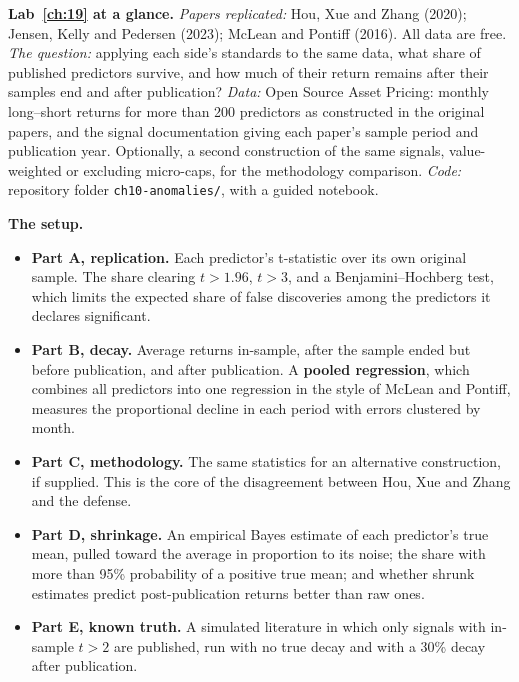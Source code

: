 \begin{callout}
\textbf{Lab~\ref{ch:19} at a glance.} \emph{Papers replicated:} Hou, Xue and Zhang (2020); Jensen, Kelly and Pedersen (2023); McLean and Pontiff (2016). All data are free. \emph{The question:} applying each side's standards to the same data, what share of published predictors survive, and how much of their return remains after their samples end and after publication? \emph{Data:} Open Source Asset Pricing: monthly long--short returns for more than 200 predictors as constructed in the original papers, and the signal documentation giving each paper's sample period and publication year. Optionally, a second construction of the same signals, value-weighted or excluding micro-caps, for the methodology comparison. \emph{Code:} repository folder \texttt{ch10-anomalies/}, with a guided notebook.
\end{callout}

\textbf{The setup.}

\begin{itemize}
  \item \textbf{Part A, replication.} Each predictor's t-statistic over its own original sample. The share clearing $t > 1.96$, $t > 3$, and a Benjamini--Hochberg test, which limits the expected share of false discoveries among the predictors it declares significant.
  \item \textbf{Part B, decay.} Average returns in-sample, after the sample ended but before publication, and after publication. A \textbf{pooled regression}, which combines all predictors into one regression in the style of McLean and Pontiff, measures the proportional decline in each period with errors clustered by month.
  \item \textbf{Part C, methodology.} The same statistics for an alternative construction, if supplied. This is the core of the disagreement between Hou, Xue and Zhang and the defense.
  \item \textbf{Part D, shrinkage.} An empirical Bayes estimate of each predictor's true mean, pulled toward the average in proportion to its noise; the share with more than 95\% probability of a positive true mean; and whether shrunk estimates predict post-publication returns better than raw ones.
  \item \textbf{Part E, known truth.} A simulated literature in which only signals with in-sample $t > 2$ are published, run with no true decay and with a 30\% decay after publication.
\end{itemize}

